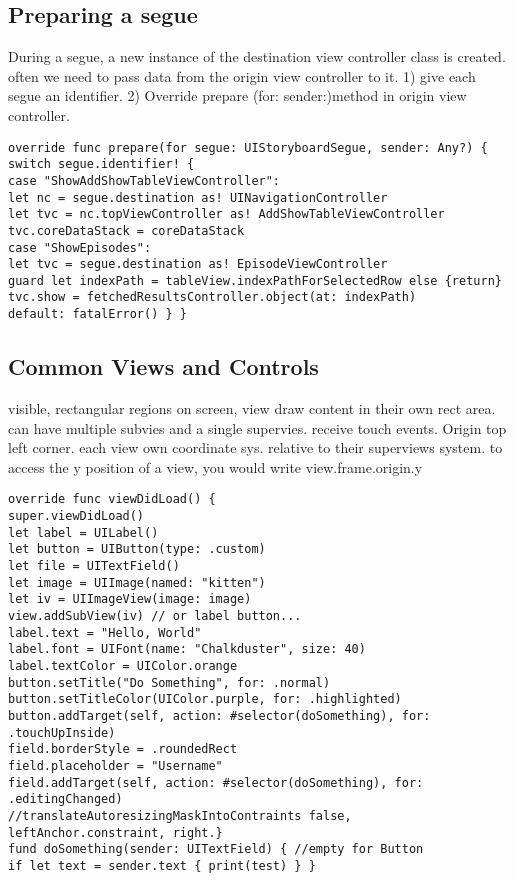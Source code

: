 \subsection{Preparing a segue}
During a segue, a new instance of the destination view controller class is created. often we need to pass data from the origin view controller to it. 1) give each segue an identifier. 2) Override prepare (for: sender:)method in origin view controller.
\begin{lstlisting}
override func prepare(for segue: UIStoryboardSegue, sender: Any?) {
switch segue.identifier! {
case "ShowAddShowTableViewController":
let nc = segue.destination as! UINavigationController
let tvc = nc.topViewController as! AddShowTableViewController
tvc.coreDataStack = coreDataStack
case "ShowEpisodes":
let tvc = segue.destination as! EpisodeViewController
guard let indexPath = tableView.indexPathForSelectedRow else {return}
tvc.show = fetchedResultsController.object(at: indexPath)
default: fatalError() } }
\end{lstlisting}

\subsection{Common Views and Controls}
visible, rectangular regions on screen, view draw content in their own rect area. can have multiple subvies and a single supervies. receive touch events. Origin top left corner. each view own coordinate sys. relative to their superviews system. to access the y position of a view, you would write view.frame.origin.y
\begin{lstlisting}
override func viewDidLoad() {
super.viewDidLoad()
let label = UILabel()
let button = UIButton(type: .custom)
let file = UITextField()
let image = UIImage(named: "kitten")
let iv = UIImageView(image: image)
view.addSubView(iv) // or label button...
label.text = "Hello, World"
label.font = UIFont(name: "Chalkduster", size: 40)
label.textColor = UIColor.orange
button.setTitle("Do Something", for: .normal)
button.setTitleColor(UIColor.purple, for: .highlighted)
button.addTarget(self, action: #selector(doSomething), for: .touchUpInside)
field.borderStyle = .roundedRect
field.placeholder = "Username"
field.addTarget(self, action: #selector(doSomething), for: .editingChanged)
//translateAutoresizingMaskIntoContraints false, leftAnchor.constraint, right.}
fund doSomething(sender: UITextField) { //empty for Button
if let text = sender.text { print(test) } }
\end{lstlisting}

